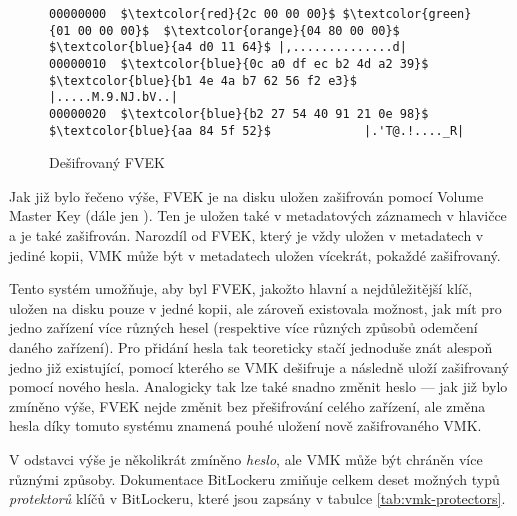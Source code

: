 \begin{figure}[h]
		\centering
		\captionsetup{width=0.65\linewidth}
\begin{lstlisting}[frame=none, escapechar=$, basicstyle=\ttfamily\small, columns=fullflexible, keepspaces=true]
00000000  $\textcolor{red}{2c 00 00 00}$ $\textcolor{green}{01 00 00 00}$  $\textcolor{orange}{04 80 00 00}$ $\textcolor{blue}{a4 d0 11 64}$ |,..............d|
00000010  $\textcolor{blue}{0c a0 df ec b2 4d a2 39}$  $\textcolor{blue}{b1 4e 4a b7 62 56 f2 e3}$ |.....M.9.NJ.bV..|
00000020  $\textcolor{blue}{b2 27 54 40 91 21 0e 98}$  $\textcolor{blue}{aa 84 5f 52}$             |.'T@.!...._R|
\end{lstlisting}
		\caption{Dešifrovaný FVEK}
		\label{fig:fvek-decrypted}
\end{figure}



Jak již bylo řečeno výše, FVEK je na disku uložen zašifrován pomocí Volume Master Key (dále jen ). Ten je uložen také v metadatových záznamech v hlavičce a je také zašifrován. Narozdíl od FVEK, který je vždy uložen v metadatech v jediné kopii, VMK může být v metadatech uložen vícekrát, pokaždé  zašifrovaný.

Tento systém umožňuje, aby byl FVEK, jakožto hlavní a nejdůležitější klíč, uložen na disku pouze v jedné kopii, ale zároveň existovala možnost, jak mít pro jedno zařízení více různých hesel (respektive více různých způsobů odemčení daného zařízení). Pro přidání  hesla tak teoreticky stačí jednoduše znát alespoň jedno již existující, pomocí kterého se VMK dešifruje a následně uloží zašifrovaný pomocí nového hesla. Analogicky tak lze také snadno změnit heslo --- jak již bylo zmíněno výše, FVEK nejde změnit bez přešifrování celého zařízení, ale změna hesla díky tomuto systému znamená pouhé uložení nově zašifrovaného VMK.

V odstavci výše je několikrát zmíněno \emph{heslo}, ale VMK může být chráněn více různými způsoby. Dokumentace BitLockeru \cite{Zxwr6wjYZUQ6z8Yo} zmiňuje celkem deset možných typů \emph{protektorů} klíčů v BitLockeru, které jsou zapsány v tabulce \ref{tab:vmk-protectors}.

